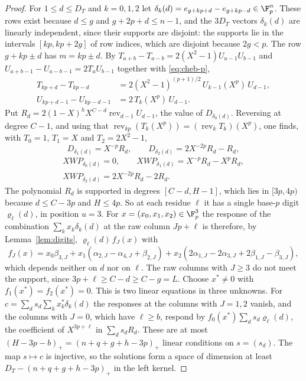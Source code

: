 \begin{proof}
For $1\le d\le D_T$ and $k=0,1,2$ let $\delta_k(d)=e_{g+kp+d}-e_{g+kp-d}\in\F_p^n$. These rows exist because
$d\le g$ and $g+2p+d\le n-1$, and the $3D_T$ vectors $\delta_k(d)$ are linearly independent, since their supports
are disjoint: the supports lie in the intervals $[kp,kp+2g]$ of row indices, which are disjoint because
$2g<p$. The row $g+kp\pm d$ has $m=kp\pm d$. By $T_{a+b}-T_{a-b}=2(X^2-1)U_{a-1}U_{b-1}$ and
$U_{a+b-1}-U_{a-b-1}=2T_aU_{b-1}$ together with \eqref{eq:cheb-p},
\begin{align*}
 T_{kp+d}-T_{kp-d}&=2(X^2-1)^{(p+1)/2}\,U_{k-1}(X^p)\,U_{d-1},\\
 U_{kp+d-1}-U_{kp-d-1}&=2\,T_k(X^p)\,U_{d-1}.
\end{align*}
Put $R_d=2(1-X)^hX^{C-d}\operatorname{rev}_{d-1}U_{d-1}$, the value of $D_{\delta_0(d)}$. Reversing at degree $C-1$,
and using that $\operatorname{rev}_{kp}(T_k(X^p))=(\operatorname{rev}_kT_k)(X^p)$, one finds, with $T_0=1$, $T_1=X$ and
$T_2=2X^2-1$,
\[
 D_{\delta_1(d)}=X^{-p}R_d,\qquad D_{\delta_2(d)}=2X^{-2p}R_d-R_d,
\]
\begin{gather*}
 XWP_{\delta_0(d)}=0,\qquad XWP_{\delta_1(d)}=X^{-p}R_d-X^pR_d,\\
 XWP_{\delta_2(d)}=2X^{-2p}R_d-2R_d .
\end{gather*}
The polynomial $R_d$ is supported in degrees $[C-d,H-1]$, which lies in $[3p,4p)$ because $d\le C-3p$ and
$H\le4p$. So at each residue $\ell$ it has a single base-$p$ digit $\varrho_\ell(d)$, in position $u=3$.
For $x=(x_0,x_1,x_2)\in\F_p^3$ the response of the combination $\sum_kx_k\delta_k(d)$ at the raw column
$Jp+\ell$ is therefore, by Lemma~\ref{lem:digits}, $\varrho_\ell(d)\,f_J(x)$ with
\[
 f_J(x)=x_0\beta_{3,J}+x_1(\alpha_{2,J}-\alpha_{4,J}+\beta_{2,J})+x_2(2\alpha_{1,J}-2\alpha_{3,J}+2\beta_{1,J}-\beta_{3,J}),
\]
which depends neither on $d$ nor on $\ell$. The raw columns with $J\ge3$ do not meet the support, since
$3p+\ell\ge C-d\ge C-g=L$. Choose $x^*\ne0$ with $f_1(x^*)=f_2(x^*)=0$. This is two linear equations in three
unknowns. For $c=\sum_ds_d\sum_kx^*_k\delta_k(d)$ the responses at the columns with $J=1,2$ vanish, and the
columns with $J=0$, which have $\ell\ge b$, respond by $f_0(x^*)\sum_ds_d\varrho_\ell(d)$, the coefficient
of $X^{3p+\ell}$ in $\sum_ds_dR_d$. These are at most $(H-3p-b)_+=(n+q+g+h-3p)_+$ linear conditions on
$s=(s_d)$. The map $s\mapsto c$ is injective, so the solutions form a space of dimension at least
$D_T-(n+q+g+h-3p)_+$ in the left kernel.
\end{proof}

